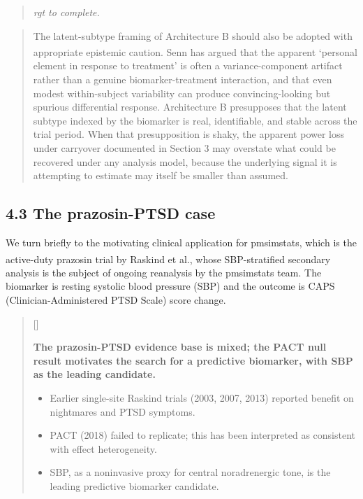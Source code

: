 \documentclass[
  11pt,
]{article}
\newcounter{pgraph}
\newenvironment{bullets}{%
  \stepcounter{pgraph}%
  \begin{quote}\small\sffamily\color[gray]{0.30}%
  {\normalfont\scriptsize\color[gray]{0.58}[\thepgraph]\enspace}}{%
  \end{quote}}
\newenvironment{rgt}{%
  \begin{quote}\small\itshape\color[RGB]{20,60,160}}{%
  \end{quote}}
\newenvironment{orig}{%
  \begin{quote}\normalsize\color[gray]{0.55}}{%
  \end{quote}}
\begin{document}
\begin{rgt}
rgt to complete.

\end{rgt}

\begin{orig}
The latent-subtype framing of Architecture B should also be adopted with
appropriate epistemic caution.
Senn\textsuperscript{} has argued
that the apparent `personal element in response to treatment' is often a
variance-component artifact rather than a genuine biomarker-treatment
interaction, and that even modest within-subject variability can produce
convincing-looking but spurious differential response. Architecture B
presupposes that the latent subtype indexed by the biomarker is real,
identifiable, and stable across the trial period. When that
presupposition is shaky, the apparent power loss under carryover
documented in Section 3 may overstate what could be recovered under any
analysis model, because the underlying signal it is attempting to
estimate may itself be smaller than assumed.

\end{orig}

\subsection{4.3 The prazosin-PTSD case}

We turn briefly to the motivating clinical application for pmsimstats,
which is the active-duty prazosin trial by Raskind et
al.\textsuperscript{}, whose
SBP-stratified secondary analysis is the subject of ongoing reanalysis
by the pmsimstats team. The biomarker is resting systolic blood pressure
(SBP) and the outcome is CAPS (Clinician-Administered PTSD Scale) score
change.

\begin{bullets}

\textbf{The prazosin-PTSD evidence base is mixed; the PACT
null result motivates the search for a predictive biomarker,
with SBP as the leading candidate.}

\begin{itemize}\setlength{\itemsep}{2pt}\setlength{\parskip}{0pt}
\item Earlier single-site Raskind trials (2003, 2007, 2013) reported benefit on nightmares and
  PTSD symptoms.
\item PACT (2018) failed to replicate; this has been
  interpreted as consistent with effect heterogeneity.
\item SBP, as a noninvasive proxy for central noradrenergic
  tone, is the leading predictive biomarker candidate.
\end{itemize}

\end{bullets}
\end{document}
